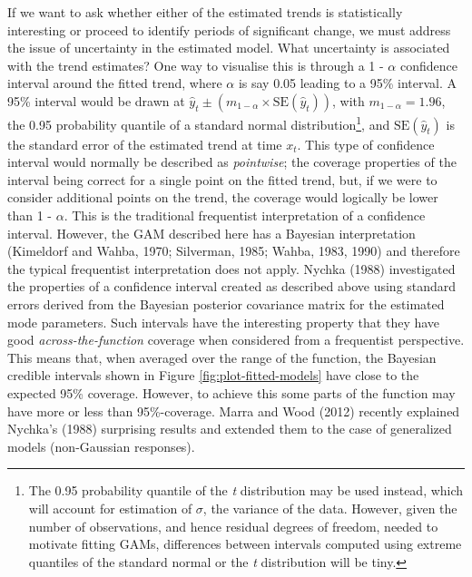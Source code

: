 \documentclass[12pt,]{article}
\begin{document}
If we want to ask whether either of the estimated trends is
statistically interesting or proceed to identify periods of significant
change, we must address the issue of uncertainty in the estimated model.
What uncertainty is associated with the trend estimates? One way to
visualise this is through a 1 - \(\alpha\) confidence interval around
the fitted trend, where \(\alpha\) is say 0.05 leading to a 95\%
interval. A 95\% interval would be drawn at
\(\hat{y}_t \pm (m_{1-\alpha} \times \text{SE}(\hat{y}_t))\), with
\(m_{1-\alpha} = 1.96\), the 0.95 probability quantile of a standard
normal distribution\footnote{The 0.95 probability quantile of the
  \emph{t} distribution may be used instead, which will account for
  estimation of \(\sigma\), the variance of the data. However, given the
  number of observations, and hence residual degrees of freedom, needed
  to motivate fitting GAMs, differences between intervals computed using
  extreme quantiles of the standard normal or the \emph{t} distribution
  will be tiny.}, and \(\text{SE}(\hat{y}_t)\) is the standard error of
the estimated trend at time \(x_t\). This type of confidence interval
would normally be described as \emph{pointwise}; the coverage properties
of the interval being correct for a single point on the fitted trend,
but, if we were to consider additional points on the trend, the coverage
would logically be lower than 1 - \(\alpha\). This is the traditional
frequentist interpretation of a confidence interval. However, the GAM
described here has a Bayesian interpretation (Kimeldorf and Wahba, 1970;
Silverman, 1985; Wahba, 1983, 1990) and therefore the typical
frequentist interpretation does not apply. Nychka (1988) investigated
the properties of a confidence interval created as described above using
standard errors derived from the Bayesian posterior covariance matrix
for the estimated mode parameters. Such intervals have the interesting
property that they have good \emph{across-the-function} coverage when
considered from a frequentist perspective. This means that, when
averaged over the range of the function, the Bayesian credible intervals
shown in Figure \ref{fig:plot-fitted-models} have close to the expected
95\% coverage. However, to achieve this some parts of the function may
have more or less than 95\%-coverage. Marra and Wood (2012) recently
explained Nychka's (1988) surprising results and extended them to the
case of generalized models (non-Gaussian responses).
\end{document}
